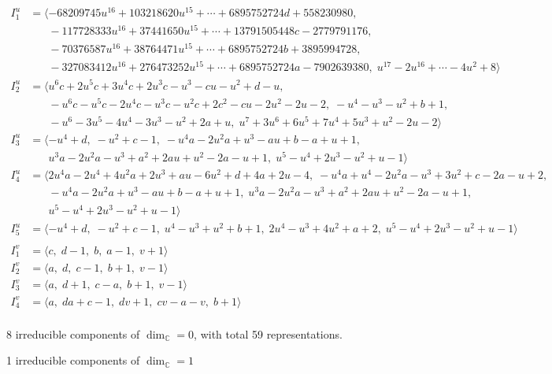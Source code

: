 \documentclass[1p]{elsarticle_modified}
\theoremstyle{definition}
\begin{document}
\begin{align*}
I^u_{1}&=\langle 
-68209745 u^{16}+103218620 u^{15}+\cdots+6895752724 d+558230980,\\
\phantom{I^u_{1}}&\phantom{= \langle  }-117728333 u^{16}+37441650 u^{15}+\cdots+13791505448 c-2779791176,\\
\phantom{I^u_{1}}&\phantom{= \langle  }-70376587 u^{16}+38764471 u^{15}+\cdots+6895752724 b+3895994728,\\
\phantom{I^u_{1}}&\phantom{= \langle  }-327083412 u^{16}+276473252 u^{15}+\cdots+6895752724 a-7902639380,\;u^{17}-2 u^{16}+\cdots-4 u^2+8\rangle \\
I^u_{2}&=\langle 
u^6 c+2 u^5 c+3 u^4 c+2 u^3 c- u^3- c u- u^2+d- u,\\
\phantom{I^u_{2}}&\phantom{= \langle  }- u^6 c- u^5 c-2 u^4 c- u^3 c- u^2 c+2 c^2- c u-2 u^2-2 u-2,\;- u^4- u^3- u^2+b+1,\\
\phantom{I^u_{2}}&\phantom{= \langle  }- u^6-3 u^5-4 u^4-3 u^3- u^2+2 a+u,\;u^7+3 u^6+6 u^5+7 u^4+5 u^3+u^2-2 u-2\rangle \\
I^u_{3}&=\langle 
- u^4+d,\;- u^2+c-1,\;- u^4 a-2 u^2 a+u^3- a u+b- a+u+1,\\
\phantom{I^u_{3}}&\phantom{= \langle  }u^3 a-2 u^2 a- u^3+a^2+2 a u+u^2-2 a- u+1,\;u^5- u^4+2 u^3- u^2+u-1\rangle \\
I^u_{4}&=\langle 
2 u^4 a-2 u^4+4 u^2 a+2 u^3+a u-6 u^2+d+4 a+2 u-4,\;- u^4 a+u^4-2 u^2 a- u^3+3 u^2+c-2 a- u+2,\\
\phantom{I^u_{4}}&\phantom{= \langle  }- u^4 a-2 u^2 a+u^3- a u+b- a+u+1,\;u^3 a-2 u^2 a- u^3+a^2+2 a u+u^2-2 a- u+1,\\
\phantom{I^u_{4}}&\phantom{= \langle  }u^5- u^4+2 u^3- u^2+u-1\rangle \\
I^u_{5}&=\langle 
- u^4+d,\;- u^2+c-1,\;u^4- u^3+u^2+b+1,\;2 u^4- u^3+4 u^2+a+2,\;u^5- u^4+2 u^3- u^2+u-1\rangle \\
\\
I^v_{1}&=\langle 
c,\;d-1,\;b,\;a-1,\;v+1\rangle \\
I^v_{2}&=\langle 
a,\;d,\;c-1,\;b+1,\;v-1\rangle \\
I^v_{3}&=\langle 
a,\;d+1,\;c- a,\;b+1,\;v-1\rangle \\
I^v_{4}&=\langle 
a,\;d a+c-1,\;d v+1,\;c v- a- v,\;b+1\rangle \\
\end{align*}
\raggedright * 8 irreducible components of $\dim_{\mathbb{C}}=0$, with total 59 representations.\\
\raggedright * 1 irreducible components of $\dim_{\mathbb{C}}=1$ \\
\end{document}

